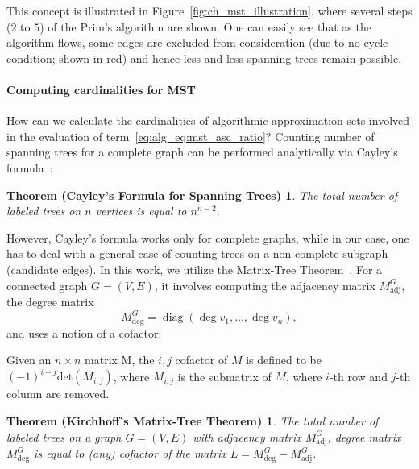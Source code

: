 This concept is illustrated in Figure~\ref{fig:ch_mst_illustration}, where
several steps ($2$ to $5$) of the Prim's algorithm are shown. One can easily see
that as the algorithm flows, some edges are excluded from consideration (due to
no-cycle condition; shown in red) and hence less and less spanning trees remain
possible.

\paragraph{Computing cardinalities for MST} How can we calculate the
cardinalities of algorithmic approximation sets involved in the evaluation of
term~\eqref{eq:alg_eq:mst_asc_ratio}? Counting number of spanning trees for a
complete graph can be performed analytically via Cayley's
formula~\citep{Aigner2010}:
\newtheorem*{cayley_thm}{Theorem (Cayley's Formula for Spanning Trees)}
\begin{cayley_thm}
  The total number of labeled trees on $n$ vertices is equal to $n^{n-2}$.
\end{cayley_thm}

However, Cayley's formula works only for complete graphs, while in our case, one
has to deal with a general case of counting trees on a non-complete subgraph
(candidate edges). In this work, we utilize the Matrix-Tree
Theorem~\citep[cf.][]{Harris:2008}. For a connected graph $G = (V,E)$, it
involves computing the adjacency matrix $M^G_{\mathrm{adj}}$, the degree matrix
\begin{equation}
  M^G_{\mathrm{deg}} = \mathop{\mathrm{diag}}(\deg{v_1}, \ldots,
\deg{v_n}),
\end{equation} 
and uses a notion of a cofactor:
%
%
%

\begin{definition}
  Given an $n \times n$ matrix M, the $i,j$ cofactor of $M$ is defined to be
  $(-1)^{i+j} \mathrm{det}(M_{i, j})$, where $M_{i, j}$
  is the submatrix of $M$, where $i$-th row and $j$-th column are removed.
\end{definition}

\newtheorem*{matrix_tree_thm}{Theorem (Kirchhoff's Matrix-Tree Theorem)}
\begin{matrix_tree_thm}
  The total number of labeled trees on a graph $G = (V,E)$ with adjacency matrix
  $M^G_{\mathrm{adj}}$, degree matrix $M^G_{\mathrm{deg}}$ is equal to (any) cofactor
  of the matrix $L = M^G_{\mathrm{deg}}- M^G_{\mathrm{adj}}$.
\end{matrix_tree_thm}

